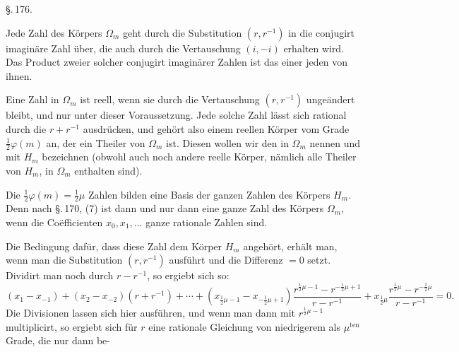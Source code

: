 \begin{center}
\S.\,176.\\[4pt]
\end{center}

Jede Zahl des K\"orpers $\Omega_m$ geht durch die Substitution $(r, r^{-1})$ in die conjugirt imagin\"are Zahl \"uber, die auch durch die Vertauschung $(i, -i)$ erhalten wird. Das Product zweier solcher conjugirt imagin\"arer Zahlen ist das  einer jeden von ihnen.

Eine Zahl in $\Omega_m$ ist reell, wenn sie durch die Vertauschung $(r, r^{-1})$ unge\"andert bleibt, und nur unter dieser Voraussetzung. Jede solche Zahl l\"asst sich rational durch die  $r + r^{-1}$ ausdr\"ucken, und geh\"ort also einem reellen K\"orper vom Grade $\frac12\varphi(m)$ an, der ein Theiler von $\Omega_m$ ist. Diesen wollen wir den in $\Omega_m$  nennen und mit $H_m$ bezeichnen (obwohl auch noch andere reelle K\"orper, n\"amlich alle Theiler von $H_m$, in $\Omega_m$ enthalten sind).

Die $\frac12\varphi(m) = \frac12\mu$ Zahlen
bilden eine Basis der ganzen Zahlen des K\"orpers $H_m$. Denn nach \S.\,170, (7) ist
dann und nur dann eine ganze Zahl des K\"orpers $\Omega_m$, wenn die Co\"efficienten $x_0, x_1, \dots$ ganze rationale Zahlen sind.

Die Bedingung daf\"ur, dass diese Zahl dem K\"orper $H_m$ angeh\"ort, erh\"alt man, wenn man die Substitution $(r, r^{-1})$ ausf\"uhrt und die Differenz $=0$ setzt. Dividirt man noch durch $r-r^{-1}$, so ergiebt sich so:
\[
(x_1-x_{-1})+(x_2-x_{-2})(r+r^{-1})+\cdots
+(x_{\frac12\mu-1}-x_{-\frac12\mu+1})\frac{r^{\frac12\mu-1}-r^{-\frac12\mu+1}}{r-r^{-1}}
+x_{\frac12\mu}\frac{r^{\frac12\mu}-r^{-\frac12\mu}}{r-r^{-1}}=0.
\]
Die Divisionen lassen sich hier ausf\"uhren, und wenn man dann mit $r^{\frac12\mu-1}$ multiplicirt, so ergiebt sich f\"ur $r$ eine rationale Gleichung von niedrigerem als $\mu^{\text{ten}}$ Grade, die nur dann be-
